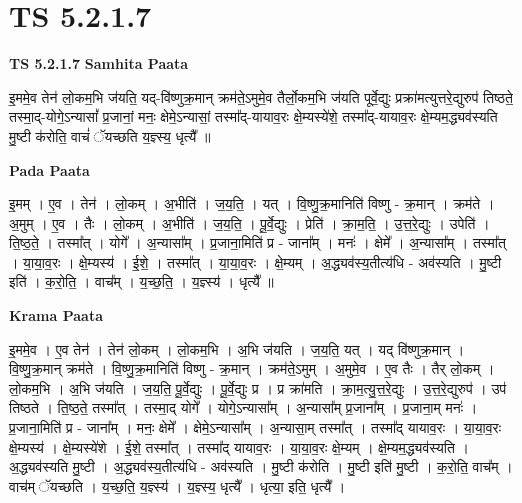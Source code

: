 \documentclass[17pt]{extarticle}
\begin{document}
\section{ TS 5.2.1.7 }

\textbf{TS 5.2.1.7 } \newline
\textbf{Samhita Paata} \newline

इ॒ममे॒व तेन॑ लो॒कम॒भि ज॑यति॒ यद्-वि॑ष्णुक्र॒मान् क्रम॑ते॒ऽमुमे॒व तैर्लो॒कम॒भि ज॑यति पूर्वे॒द्युः प्रक्रा॑मत्युत्तरे॒द्युरुप॑ तिष्ठते॒ तस्मा॒द्-योगे॒ऽन्यासां᳚ प्र॒जानां॒ मनः॒ क्षेमे॒ऽन्यासां॒ तस्मा᳚द्-यायाव॒रः क्षे॒म्यस्ये॑शे॒ तस्मा᳚द्-यायाव॒रः क्षे॒म्यम॒द्ध्यव॑स्यति मु॒ष्टी क॑रोति॒ वाचं॑ ॅयच्छति य॒ज्ञ्स्य॒ धृत्यै᳚ ॥ \newline

\textbf{Pada Paata} \newline

इ॒मम् । ए॒व । तेन॑ । लो॒कम् । अ॒भीति॑ । ज॒य॒ति॒ । यत् । वि॒ष्णु॒क्र॒मानिति॑ विष्णु - क्र॒मान् । क्रम॑ते । अ॒मुम् । ए॒व । तैः । लो॒कम् । अ॒भीति॑ । ज॒य॒ति॒ । पू॒र्वे॒द्युः । प्रेति॑ । क्रा॒म॒ति॒ । उ॒त्त॒रे॒द्युः । उपेति॑ । ति॒ष्ठ॒ते॒ । तस्मा᳚त् । योगे᳚ । अ॒न्यासा᳚म् । प्र॒जाना॒मिति॑ प्र - जाना᳚म् । मनः॑ । क्षेमे᳚ । अ॒न्यासा᳚म् । तस्मा᳚त् । या॒या॒व॒रः । क्षे॒म्यस्य॑ । ई॒शे॒ । तस्मा᳚त् । या॒या॒व॒रः । क्षे॒म्यम् । अ॒द्ध्यव॑स्य॒तीत्य॑धि - अव॑स्यति । मु॒ष्टी इति॑ । क॒रो॒ति॒ । वाच᳚म् । य॒च्छ॒ति॒ । य॒ज्ञ्स्य॑ । धृत्यै᳚ ॥  \newline


\textbf{Krama Paata} \newline

इ॒ममे॒व । ए॒व तेन॑ । तेन॑ लो॒कम् । लो॒कम॒भि । अ॒भि ज॑यति । ज॒य॒ति॒ यत् । यद् वि॑ष्णुक्र॒मान् । वि॒ष्णु॒क्र॒मान् क्रम॑ते । वि॒ष्णु॒क्र॒मानिति॑ विष्णु - क्र॒मान् । क्रम॑ते॒ऽमुम् । अ॒मुमे॒व । ए॒व तैः । तैर् लो॒कम् । लो॒कम॒भि । अ॒भि ज॑यति । ज॒य॒ति॒ पू॒र्वे॒द्युः । पू॒र्वे॒द्युः प्र । प्र क्रा॑मति । क्रा॒म॒त्यु॒त्त॒रे॒द्युः । उ॒त्त॒रे॒द्युरुप॑ । उप॑ तिष्ठते । ति॒ष्ठ॒ते॒ तस्मा᳚त् । तस्मा॒द् योगे᳚ । योगे॒ऽन्यासा᳚म् । अ॒न्यासा᳚म् प्र॒जाना᳚म् । प्र॒जाना॒म् मनः॑ । प्र॒जाना॒मिति॑ प्र - जाना᳚म् । मनः॒ क्षेमे᳚ । क्षेमे॒ऽन्यासा᳚म् । अ॒न्यासा॒म् तस्मा᳚त् । तस्मा᳚द् यायाव॒रः । या॒या॒व॒रः क्षे॒म्यस्य॑ । क्षे॒म्यस्ये॑शे । ई॒शे॒ तस्मा᳚त् । तस्मा᳚द् यायाव॒रः । या॒या॒व॒रः क्षे॒म्यम् । क्षे॒म्यम॒द्ध्यव॑स्यति । अ॒द्ध्यव॑स्यति मु॒ष्टी । अ॒द्ध्यव॑स्य॒तीत्य॑धि - अव॑स्यति । मु॒ष्टी क॑रोति । मु॒ष्टी इति॑ मु॒ष्टी । क॒रो॒ति॒ वाच᳚म् । वाच॑म् ॅयच्छति । य॒च्छ॒ति॒ य॒ज्ञ्स्य॑ । य॒ज्ञ्स्य॒ धृत्यै᳚ । धृत्या॒ इति॒ धृत्यै᳚ । \newline
\end{document}
